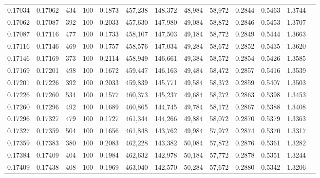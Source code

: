 \begin{tabular}{rrrrrrrrrrrrr}
0.17034 & 0.17062 &   434 & 100 &                                     0.1873 & 457,238 & 148,372 &  48,984 &  58,972 & 0.2844 & 0.5463 & 1.3744 \\
0.17062 & 0.17087 &   392 & 100 &                                     0.2033 & 457,630 & 147,980 &  49,084 &  58,872 & 0.2846 & 0.5453 & 1.3707 \\
0.17087 & 0.17116 &   477 & 100 &                                     0.1733 & 458,107 & 147,503 &  49,184 &  58,772 & 0.2849 & 0.5444 & 1.3663 \\
0.17116 & 0.17146 &   469 & 100 &                                     0.1757 & 458,576 & 147,034 &  49,284 &  58,672 & 0.2852 & 0.5435 & 1.3620 \\
0.17146 & 0.17169 &   373 & 100 &                                     0.2114 & 458,949 & 146,661 &  49,384 &  58,572 & 0.2854 & 0.5426 & 1.3585 \\
0.17169 & 0.17201 &   498 & 100 &                                     0.1672 & 459,447 & 146,163 &  49,484 &  58,472 & 0.2857 & 0.5416 & 1.3539 \\
0.17201 & 0.17226 &   392 & 100 &                                     0.2033 & 459,839 & 145,771 &  49,584 &  58,372 & 0.2859 & 0.5407 & 1.3503 \\
0.17226 & 0.17260 &   534 & 100 &                                     0.1577 & 460,373 & 145,237 &  49,684 &  58,272 & 0.2863 & 0.5398 & 1.3453 \\
0.17260 & 0.17296 &   492 & 100 &                                     0.1689 & 460,865 & 144,745 &  49,784 &  58,172 & 0.2867 & 0.5388 & 1.3408 \\
0.17296 & 0.17327 &   479 & 100 &                                     0.1727 & 461,344 & 144,266 &  49,884 &  58,072 & 0.2870 & 0.5379 & 1.3363 \\
0.17327 & 0.17359 &   504 & 100 &                                     0.1656 & 461,848 & 143,762 &  49,984 &  57,972 & 0.2874 & 0.5370 & 1.3317 \\
0.17359 & 0.17383 &   380 & 100 &                                     0.2083 & 462,228 & 143,382 &  50,084 &  57,872 & 0.2876 & 0.5361 & 1.3282 \\
0.17384 & 0.17409 &   404 & 100 &                                     0.1984 & 462,632 & 142,978 &  50,184 &  57,772 & 0.2878 & 0.5351 & 1.3244 \\
0.17409 & 0.17438 &   408 & 100 &                                     0.1969 & 463,040 & 142,570 &  50,284 &  57,672 & 0.2880 & 0.5342 & 1.3206 \\

\end{tabular}
